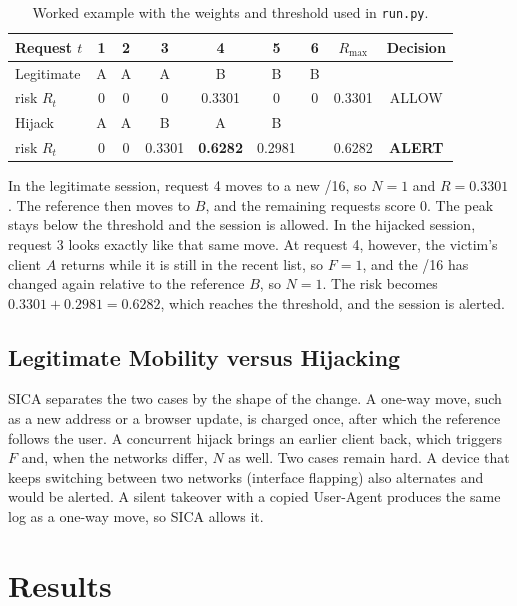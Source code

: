 \documentclass[conference]{IEEEtran}
\begin{document}
\begin{table}[t]
\centering
\caption{Worked example with the weights and threshold used in \texttt{run.py}.}
\label{tab:example}
\footnotesize
\setlength{\tabcolsep}{3.6pt}
\begin{tabular}{@{}lcccccccc@{}}
\toprule
Request $t$ & 1 & 2 & 3 & 4 & 5 & 6 & $R_{\max}$ & Decision \\
\midrule
Legitimate & A & A & A & B & B & B & & \\
\quad risk $R_t$ & 0 & 0 & 0 & 0.3301 & 0 & 0 & 0.3301 & ALLOW \\
\midrule
Hijack & A & A & B & A & B & & & \\
\quad risk $R_t$ & 0 & 0 & 0.3301 & \textbf{0.6282} & 0.2981 & & 0.6282 & \textbf{ALERT} \\
\bottomrule
\end{tabular}
\end{table}

In the legitimate session, request 4 moves to a new /16, so $N=1$ and
$R=0.3301$. The reference then moves to $B$, and the remaining requests score 0.
The peak stays below the threshold and the session is allowed. In the hijacked
session, request 3 looks exactly like that same move. At request 4, however,
the victim's client $A$ returns while it is still in the recent list, so $F=1$,
and the /16 has changed again relative to the reference $B$, so $N=1$. The risk
becomes $0.3301+0.2981=0.6282$, which reaches the threshold, and the session is
alerted.

\subsection{Legitimate Mobility versus Hijacking}

SICA separates the two cases by the shape of the change. A one-way move, such as
a new address or a browser update, is charged once, after which the reference
follows the user. A concurrent hijack brings an earlier client back, which
triggers $F$ and, when the networks differ, $N$ as well. Two cases remain hard.
A device that keeps switching between two networks (interface flapping) also
alternates and would be alerted. A silent takeover with a copied User-Agent
produces the same log as a one-way move, so SICA allows it.

\section{Results}
\end{document}
